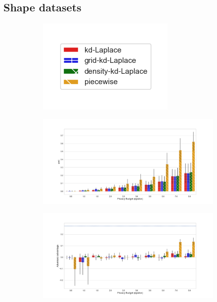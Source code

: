 \subsection{Shape datasets}

\begin{figure}[H]
  \centering
  \begin{subfigure}{0.30\textwidth}
    \includegraphics[width=\textwidth]{Results/kd-laplace/ami_bar_comparison_legend.png}
  \end{subfigure}
  \begin{subfigure}{1\textwidth}
    \includegraphics[width=1\textwidth]{Results/nd-laplace/ami_circle-dataset_comparison.png}
  \end{subfigure}
  \begin{subfigure}{1\textwidth}
    \includegraphics[width=1\textwidth]{Results/nd-laplace/attack_adv_circle-dataset_comparison.png}

\end{subfigure}
\end{figure}
